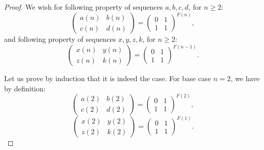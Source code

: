 \documentclass[12pt]{article}
\theoremstyle{definition}
\begin{document}
\begin{proof}
    We wish for following property of sequences $a,b,c,d$, for $n \geq 2$:
    $$
    \begin{pmatrix}
        a(n) & b(n)\\ 
        c(n) & d(n)
    \end{pmatrix} =
    \begin{pmatrix}
        0 & 1\\ 
        1 & 1
    \end{pmatrix}^{F(n)},
    $$
    and following property of sequences $x,y,z,k$, for $n \geq 2$:
    $$
    \begin{pmatrix}
        x(n) & y(n)\\ 
        z(n) & k(n)
    \end{pmatrix} =
    \begin{pmatrix}
        0 & 1\\ 
        1 & 1
    \end{pmatrix}^{F(n-1)}.
    $$

    Let us prove by induction that it is indeed the case. For base case $n=2$, we have by definition:
    $$
    \begin{pmatrix}
        a(2) & b(2)\\ 
        c(2) & d(2)
    \end{pmatrix} =
    \begin{pmatrix}
        0 & 1\\ 
        1 & 1
    \end{pmatrix}^{F(2)},
    $$
    $$
    \begin{pmatrix}
        x(2) & y(2)\\ 
        z(2) & k(2)
    \end{pmatrix} =
    \begin{pmatrix}
        0 & 1\\ 
        1 & 1
    \end{pmatrix}^{F(1)}.
    $$


\end{proof}
\end{document}
